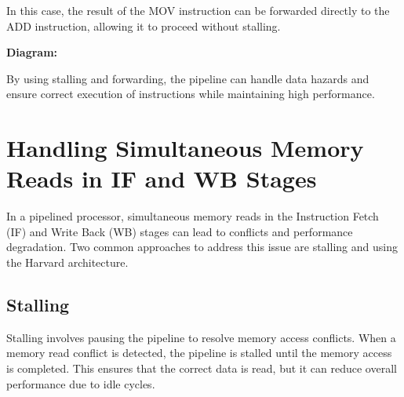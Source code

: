 \documentclass{report}
\begin{document}
In this case, the result of the MOV instruction can be forwarded directly to the ADD instruction, allowing it to proceed without stalling.

\textbf{Diagram:}
\begin{center}
\end{center}

By using stalling and forwarding, the pipeline can handle data hazards and ensure correct execution of instructions while maintaining high performance.

\section{Handling Simultaneous Memory Reads in IF and WB Stages}

In a pipelined processor, simultaneous memory reads in the Instruction Fetch (IF) and Write Back (WB) stages can lead to conflicts and performance degradation. Two common approaches to address this issue are stalling and using the Harvard architecture.

\subsection{Stalling}

Stalling involves pausing the pipeline to resolve memory access conflicts. When a memory read conflict is detected, the pipeline is stalled until the memory access is completed. This ensures that the correct data is read, but it can reduce overall performance due to idle cycles.
\end{document}
